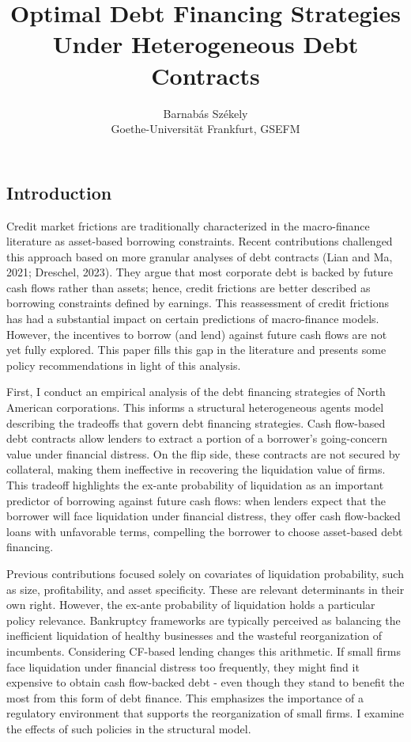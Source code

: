 \documentclass[12pt]{article}
\title{\vspace{-0.5cm} Optimal Debt Financing Strategies Under Heterogeneous Debt Contracts}
\author{Barnabás Székely \\ \small  Goethe-Universität Frankfurt, GSEFM}
\date{}
\begin{document}
\maketitle


\subsection*{Introduction} \label{sec:introduction}

Credit market frictions are traditionally characterized in the macro-finance literature as asset-based borrowing constraints. Recent contributions  challenged this approach based on more granular analyses of debt contracts (Lian and Ma, 2021; Dreschel, 2023). They argue that most corporate debt is backed by future cash flows rather than assets; hence, credit frictions are better described as borrowing constraints defined by earnings. This reassessment of credit frictions has had a substantial impact on certain predictions of macro-finance models. However, the incentives to borrow (and lend) against future cash flows are not yet fully explored. This paper fills this gap in the literature and presents some policy recommendations in light of this analysis. 

First, I conduct an empirical analysis of the debt financing strategies of North American corporations. This informs a structural heterogeneous agents model describing the tradeoffs that govern debt financing strategies. Cash flow-based debt contracts allow lenders to extract a portion of a borrower's going-concern value under financial distress. On the flip side, these contracts are not secured by collateral, making them ineffective in recovering the liquidation value of firms. This tradeoff highlights the ex-ante probability of liquidation as an important predictor of borrowing against future cash flows: when lenders expect that the borrower will face liquidation under financial distress, they offer cash flow-backed loans with unfavorable terms, compelling the borrower to choose asset-based debt financing.

Previous contributions focused solely on covariates of liquidation probability, such as size, profitability, and asset specificity. These are relevant determinants in their own right. However, the ex-ante probability of liquidation holds a particular policy relevance. Bankruptcy frameworks are typically perceived as balancing the inefficient liquidation of healthy businesses and the wasteful reorganization of incumbents. Considering CF-based lending changes this arithmetic. If small firms face liquidation under financial distress too frequently, they might find it expensive to obtain cash flow-backed debt - even though they stand to benefit the most from this form of debt finance. This emphasizes the importance of a regulatory environment that supports the reorganization of small firms. I examine the effects of such policies in the structural model.
\end{document}
